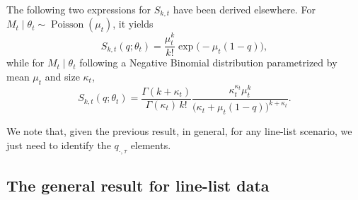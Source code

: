 \documentclass{article}
\theoremstyle{definition}
\theoremstyle{remark}
\newcommand{\Pois}{\operatorname{Poisson}}
\begin{document}
The following two expressions for $S_{k,t}$ have been derived elsewhere. For $M_t\mid\theta_t\sim\Pois(\mu_t)$, it yields
\begin{equation}\label{poissonS}
    S_{k,t}(q;\theta_t) = \dfrac{\mu_t^k}{k!} \exp\big(-\mu_t(1 - q)\big),
\end{equation}
while for $M_t\mid\theta_t$ following a Negative Binomial distribution parametrized by mean $\mu_t$ and size $\kappa_t$,
\begin{equation}\label{negbinS}
    S_{k,t}(q;\theta_t) 
    = 
    \dfrac{\Gamma(k + \kappa_t)}{\Gamma(\kappa_t)\, k!} 
    \dfrac{\kappa_t^{\kappa_t}\mu_t^k}
    {\big(\kappa_t + \mu_t (1 - q)\big)^{k + \kappa_t}}.
\end{equation}

We note that, given the previous result, in general, for any line-list scenario, we just need to identify the $q_{\cdot,\tau}$ elements. 

\subsection{The general result for line-list data}
\end{document}
